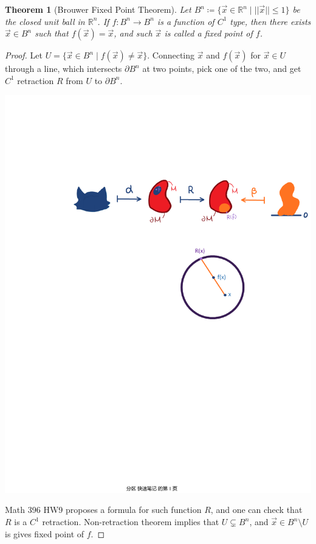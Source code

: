 \documentclass[15pt]{book}
\theoremstyle{break}
\theoremstyle{break}
\newtheorem{thm}{Theorem}[section]
\newcommand{\R}{\mathbb{R}}
\begin{document}
\begin{thm}[Brouwer Fixed Point Theorem]
Let $B^n\coloneqq \{ \vec{x}\in \R^n \mid ||\vec{x}|| \leq 1 \}$ be the closed unit ball in $\R^n$. 
If $f:B^n \to B^n$ is a function of $C^1$ type, then there exists $\vec{x}\in B^n$ such that $f(\vec{x}) = \vec{x}$, and such $\vec{x}$ is called a fixed point of $f$. 
\end{thm}
\begin{proof}
Let $U = \{ \vec{x}\in B^n \mid f(\vec{x}) \neq \vec{x}\}$. Connecting $\vec{x}$ and $f(\vec{x})$ for $\vec{x}\in U$ through a line, which intersects $\partial B^n$ at two points, pick one of the two, and get $C^1$ retraction $R$ from $U$ to $\partial B^n$. 
\begin{center}
\includegraphics[scale=0.9]{fixpt.pdf}
\end{center}
Math 396 HW9 proposes a formula for such function $R$, and one can check that $R$ is a $C^1$ retraction. Non-retraction theorem implies that $U \subsetneq B^n$, and $\vec{x}\in B^n\setminus U$ is gives fixed point of $f$.
\end{proof}
\end{document}
